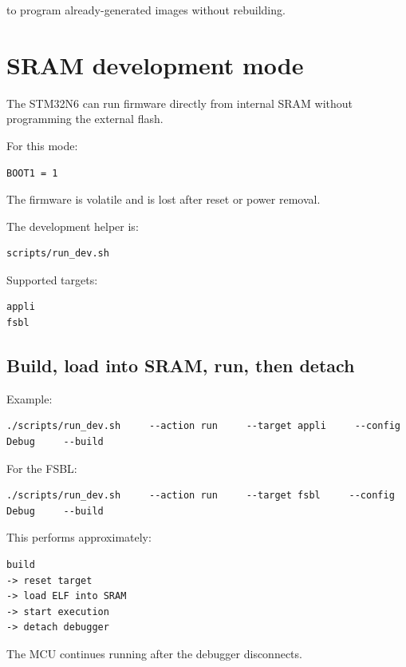 \documentclass[10pt,a4paper,oneside]{report}
\begin{document}
to program already-generated images without rebuilding.

\section{SRAM development mode}\label{wiki-getting-started-build-flash-debug--7-sram-development-mode}

The STM32N6 can run firmware directly from internal SRAM without programming the external flash.

For this mode:

\begin{verbatim}
BOOT1 = 1
\end{verbatim}

The firmware is volatile and is lost after reset or power removal.

The development helper is:

\begin{verbatim}
scripts/run_dev.sh
\end{verbatim}

Supported targets:

\begin{verbatim}
appli
fsbl
\end{verbatim}

\subsection{Build, load into SRAM, run, then detach}\label{wiki-getting-started-build-flash-debug--build-load-into-sram-run-then-detach}

Example:

\begin{verbatim}
./scripts/run_dev.sh     --action run     --target appli     --config Debug     --build
\end{verbatim}

For the FSBL:

\begin{verbatim}
./scripts/run_dev.sh     --action run     --target fsbl     --config Debug     --build
\end{verbatim}

This performs approximately:

\begin{verbatim}
build
-> reset target
-> load ELF into SRAM
-> start execution
-> detach debugger
\end{verbatim}

The MCU continues running after the debugger disconnects.
\end{document}
